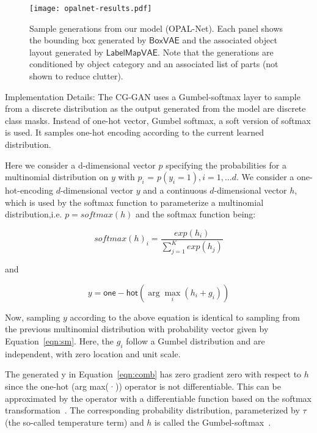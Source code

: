 \documentclass[runningheads]{llncs}
\begin{document}
\begin{figure*}[!ht]
  \centering
  \texttt{[image: opalnet-results.pdf]}
  \caption{Sample generations from our model (OPAL-Net). Each panel shows the bounding box generated by $\mathsf{BoxVAE}$ and the associated object layout generated by $\mathsf{LabelMapVAE}$. Note that the generations are conditioned by object category and an associated list of parts (not shown to reduce clutter).}
  \label{fig:opalgen}
\end{figure*}

\noindent Implementation Details: The CG-GAN uses a Gumbel-softmax layer to sample from a discrete distribution as the output generated from the model are discrete class masks. Instead of one-hot vector, Gumbel softmax, a soft version of softmax is used. It samples one-hot encoding according to the current learned distribution.

Here we consider a d-dimensional vector $p$ specifying the  probabilities for a multinomial distribution on $y$ with $p_i$ = $p(y_i = 1), i = 1,\ldots d$. We consider a one-hot-encoding
$d$-dimensional vector $y$ and a continuous $d$-dimensional vector $h$, which is used by the softmax function to parameterize a multinomial distribution,i.e. $p = softmax(h)$ and the softmax function being:

\begin{equation}
    softmax(h)_i = \frac{exp(h_i)}{\sum_{j=1}^{K} exp(h_j)}
    \label{eqn:sm}
\end{equation}

\noindent and

\begin{equation}
y = \mathsf{one-hot}(\arg \max_i (h_i + g_i))
\label{eqn:comb}
\end{equation}

Now, sampling $y$ according to the above equation is identical to sampling from the previous multinomial distribution with probability vector given by Equation~\ref{eqn:sm}. Here, the $g_i$ follow a Gumbel distribution and are independent, with zero location and unit scale.

The generated y in Equation~\ref{eqn:comb} has zero gradient zero with respect to $h$ since the one-hot (arg max(·)) operator is not differentiable. This can be approximated by the operator with a differentiable function based on the softmax transformation~\cite{jang2016categorical}. The corresponding probability distribution, parameterized by $\tau$ (the so-called temperature term) and $h$ is called the Gumbel-softmax~\cite{kusner2016gans}.
\end{document}
